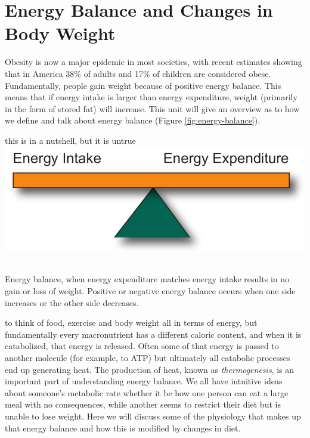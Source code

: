 \documentclass{tufte-handout}
\begin{document}
\section{Energy Balance and Changes in Body Weight}

Obesity is now a major epidemic in most societies, with recent estimates showing that in America 38\% of adults and 17\% of children are considered obese\citep{Flegal2016,Ogden2016}.  Fundamentally, people gain weight because of positive energy balance.  This means that if energy intake is larger than energy expenditure, weight (primarily in the form of stored fat) will increase.  This unit will give an overview as to how we define and talk about energy balance (Figure \ref{fig:energy-balance}).

\begin{marginfigure} this is in a nutshell, but it is untrue
\includegraphics{figures/Energy-Balance.pdf}\
\caption{Energy balance, when energy expenditure matches energy intake results in no gain or loss of weight.  Positive or negative energy balance occurs when one side increases or the other side decreases.}
\label{fig:energy-balance}
\end{marginfigure}

 to think of food, exercise and body weight all in terms of energy, but fundamentally every macronutrient has a different caloric content, and when it is catabolized, that energy is released.  Often some of that energy is passed to another molecule (for example, to ATP) but ultimately all catabolic processes end up generating heat.  The production of heat, known as \emph{thermogenesis}, is an important part of understanding energy balance.  We all have intuitive ideas about someone's metabolic rate whether it be how one person can eat a large meal with no consequences, while another seems to restrict their diet but is unable to lose weight.  Here we will discuss some of the physiology that makes up that energy balance and how this is modified by changes in diet.
\end{document}
